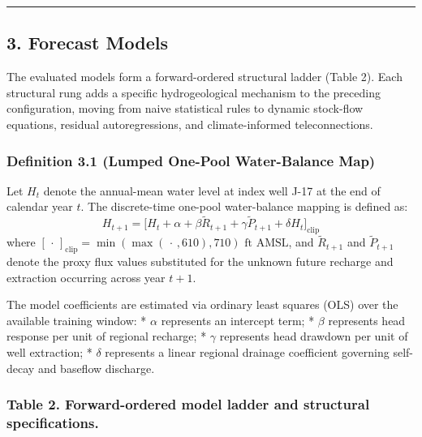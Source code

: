 \documentclass[11pt]{article}
\begin{document}
\begin{center}\rule{0.5\linewidth}{0.5pt}\end{center}

\subsection{3. Forecast Models}\label{forecast-models}

The evaluated models form a forward-ordered structural ladder (Table 2).
Each structural rung adds a specific hydrogeological mechanism to the
preceding configuration, moving from naive statistical rules to dynamic
stock-flow equations, residual autoregressions, and climate-informed
teleconnections.

\subsubsection{Definition 3.1 (Lumped One-Pool Water-Balance
Map)}\label{definition-3.1-lumped-one-pool-water-balance-map}

Let \(H_t\) denote the annual-mean water level at index well J-17 at the
end of calendar year \(t\). The discrete-time one-pool water-balance
mapping is defined as:
\[H_{t+1} = \Big[ H_t + \alpha + \beta \tilde{R}_{t+1} + \gamma \tilde{P}_{t+1} + \delta H_t \Big]_{\mathrm{clip}}\]
where
\([\,\cdot\,]_{\mathrm{clip}} = \min(\max(\,\cdot\,, 610), 710)\text{ ft AMSL}\),
and \(\tilde{R}_{t+1}\) and \(\tilde{P}_{t+1}\) denote the proxy flux
values substituted for the unknown future recharge and extraction
occurring across year \(t+1\).

The model coefficients are estimated via ordinary least squares (OLS)
over the available training window: * \(\alpha\) represents an intercept
term; * \(\beta\) represents head response per unit of regional
recharge; * \(\gamma\) represents head drawdown per unit of well
extraction; * \(\delta\) represents a linear regional drainage
coefficient governing self-decay and baseflow discharge.

\subsubsection{Table 2. Forward-ordered model ladder and structural
specifications.}\label{table-2.-forward-ordered-model-ladder-and-structural-specifications.}
\end{document}
